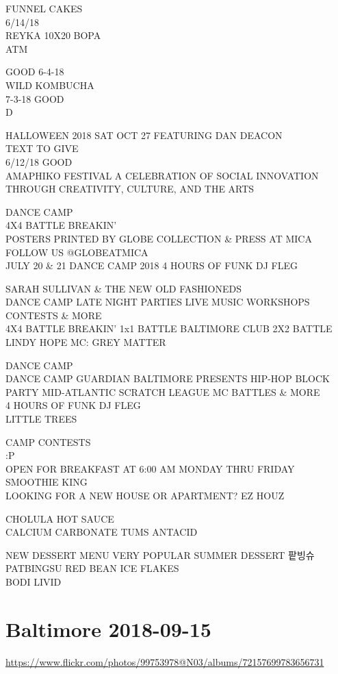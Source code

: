 \documentclass[10pt,letterpaper]{article}
\begin{document}
FUNNEL CAKES\\
6/14/18\\
REYKA 10X20 BOPA\\
ATM

GOOD 6{-}4{-}18\\
WILD KOMBUCHA\\
7{-}3{-}18 GOOD\\
D

HALLOWEEN 2018 SAT OCT 27 FEATURING DAN DEACON\\
TEXT TO GIVE\\
6/12/18 GOOD\\
AMAPHIKO FESTIVAL A CELEBRATION OF SOCIAL INNOVATION THROUGH CREATIVITY, CULTURE, AND THE ARTS

DANCE CAMP\\
4X4 BATTLE BREAKIN'\\
POSTERS PRINTED BY GLOBE COLLECTION \& PRESS AT MICA FOLLOW US @GLOBEATMICA\\
JULY 20 \& 21 DANCE CAMP 2018 4 HOURS OF FUNK DJ FLEG

SARAH SULLIVAN \& THE NEW OLD FASHIONEDS\\
DANCE CAMP LATE NIGHT PARTIES LIVE MUSIC WORKSHOPS CONTESTS \& MORE\\
4X4 BATTLE BREAKIN' 1x1 BATTLE BALTIMORE CLUB 2X2 BATTLE LINDY HOPE MC: GREY MATTER

DANCE CAMP\\
DANCE CAMP GUARDIAN BALTIMORE PRESENTS HIP{-}HOP BLOCK PARTY MID{-}ATLANTIC SCRATCH LEAGUE MC BATTLES \& MORE\\
4 HOURS OF FUNK DJ FLEG\\
LITTLE TREES

CAMP CONTESTS\\
:P\\
OPEN FOR BREAKFAST AT 6:00 AM MONDAY THRU FRIDAY SMOOTHIE KING\\
LOOKING FOR A NEW HOUSE OR APARTMENT?  EZ HOUZ

CHOLULA HOT SAUCE\\
CALCIUM CARBONATE TUMS ANTACID

NEW DESSERT MENU VERY POPULAR SUMMER DESSERT 팥빙슈 PATBINGSU RED BEAN ICE FLAKES\\
BODI LIVID
\pagebreak

\section*{Baltimore 2018-09-15}

\url{https://www.flickr.com/photos/99753978@N03/albums/72157699783656731}
\end{document}
